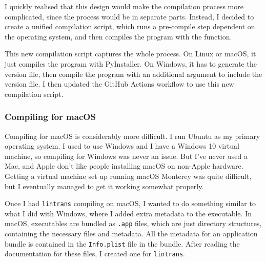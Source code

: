\documentclass[../development.tex]{subfiles}
\begin{document}


I quickly realised that this design would make the compilation process more complicated, since the process would be in separate parts. Instead, I decided to create a unified compilation script, which runs a pre-compile step dependent on the operating system, and then compiles the program with the  function.


This new compilation script captures the whole process. On Linux or macOS, it just compiles the program with PyInstaller. On Windows, it has to generate the version file, then compile the program with an additional argument to include the version file. I then updated the GitHub Actions workflow to use this new compilation script.


\subsubsection{Compiling for macOS\label{development:preparing-for-v0.2.1:compiling-for-macos}}

Compiling for macOS is considerably more difficult. I run Ubuntu as my primary operating system. I used to use Windows and I have a Windows 10 virtual machine, so compiling for Windows was never an issue. But I've never used a Mac, and Apple don't like people installing macOS on non-Apple hardware. Getting a virtual machine set up running macOS Monterey was quite difficult, but I eventually managed to get it working somewhat properly.

Once I had \texttt{lintrans} compiling on macOS, I wanted to do something similar to what I did with Windows, where I added extra metadata to the executable. In macOS, executables are bundled as \texttt{.app} files, which are just directory structures, containing the necessary files and metadata\cite{apple-bundle-structures}. All the metadata for an application bundle is contained in the \texttt{Info.plist} file in the bundle\cite{apple-about-info.plist-files}\cite{apple-about-info.plist-keys-and-values}. After reading the documentation for these files, I created one for \texttt{lintrans}.
\end{document}
